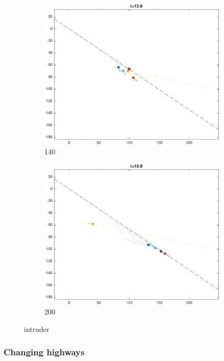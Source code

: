 \begin{figure}
    \begin{subfigure}{0.23\textwidth} \label{subfig:in_140}
        \includegraphics[width=\textwidth]{fig/in_140}
        \caption{140}
    \end{subfigure}
    \begin{subfigure}{0.23\textwidth} \label{subfig:in_200}
        \includegraphics[width=\textwidth]{fig/in_200}
        \caption{200}
    \end{subfigure}   
    \caption{intruder}    
\end{figure}

\subsubsection{Changing highways}


